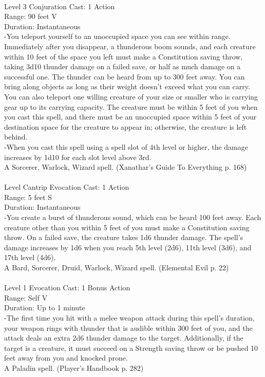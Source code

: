\documentclass[10pt,twocolumn]{report}
\begin{document}
 \\
Level 3 \quad Conjuration \quad Cast: 1 Action\\
Range: 90 feet \quad V\\
Duration: Instantaneous \quad \\
-You teleport yourself to an unoccupied space you can see within range. Immediately after you disappear, a thunderous boom sounds, and each creature within 10 feet of the space you left must make a Constitution saving throw, taking 3d10 thunder damage on a failed save, or half as much damage on a successful one. The thunder can be heard from up to 300 feet away.
You can bring along objects as long as their weight doesn’t exceed what you can carry. You can also teleport one willing creature of your size or smaller who is carrying gear up to its carrying capacity. The creature must be within 5 feet of you when you cast this spell, and there must be an unoccupied space within 5 feet of your destination space for the creature to appear in; otherwise, the creature is left behind.\\
-When you cast this spell using a spell slot of 4th level or higher, the damage increases by 1d10 for each slot level above 3rd.\\
A Sorcerer, Warlock, Wizard spell. (Xanathar's Guide To Everything p. 168) \\


 \\
Level Cantrip \quad Evocation \quad Cast: 1 Action\\
Range: 5 feet \quad S\\
Duration: Instantaneous \quad \\
-You create a burst of thunderous sound, which can be heard 100 feet away. 
Each creature other than you within 5 feet of you must make a Constitution saving throw. On a failed save, the creature takes 1d6 thunder damage. 
The spell’s damage increases by 1d6 when you reach 5th level (2d6), 11th level (3d6), and 17th level (4d6).\\
A Bard, Sorcerer, Druid, Warlock, Wizard spell. (Elemental Evil p. 22) \\


 \\
Level 1 \quad Evocation \quad Cast: 1 Bonus Action\\
Range: Self \quad V\\
Duration: Up to 1 minute \quad \\
-The first time you hit with a melee weapon attack during this spell’s duration, your weapon rings with thunder that is audible within 300 feet of you, and the attack deals an extra 2d6 thunder damage to the target. Additionally, if the target is a creature, it must succeed on a Strength saving throw or be pushed 10 feet away from you and knocked prone.\\
A Paladin spell. (Player's Handbook p. 282) \\
\end{document}

